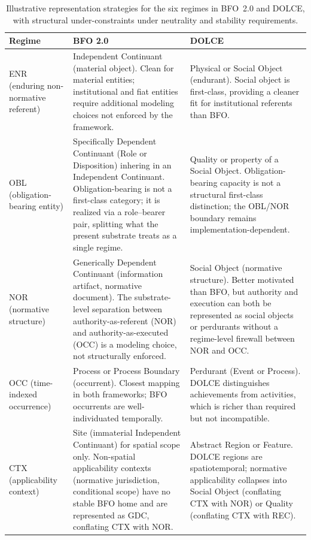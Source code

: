 \begin{table}[!htbp]
\centering
\caption{Illustrative representation strategies for the six regimes
in BFO~2.0 and DOLCE, with structural under-constraints
under neutrality and stability requirements.}
\label{tab:regime-mapping}
\small
\renewcommand{\arraystretch}{1.15}
\begin{tabular}{@{} p{1.5cm} p{5.2cm} p{4.7cm}@{}}
\toprule
\textbf{Regime} & \textbf{BFO 2.0} & \textbf{DOLCE} \\
\midrule

ENR (enduring non-normative referent) & Independent Continuant (material object).
Clean for material entities; institutional and fiat entities
require additional modeling choices not enforced by the framework. &
Physical or Social Object (endurant).
Social object is first-class, providing a cleaner fit for
institutional referents than BFO. \\

OBL (obligation-bearing entity) &
Specifically Dependent Continuant (Role or Disposition)
inhering in an Independent Continuant.
Obligation-bearing is not a first-class category;
it is realized via a role--bearer pair,
splitting what the present substrate treats as a single regime. &
Quality or property of a Social Object.
Obligation-bearing capacity is not a structural first-class
distinction; the OBL/NOR boundary remains implementation-dependent. \\

NOR (normative structure) &
Generically Dependent Continuant (information artifact,
normative document).
The substrate-level separation between authority-as-referent (NOR)
and authority-as-executed (OCC) is a modeling choice,
not structurally enforced. &
Social Object (normative structure).
Better motivated than BFO, but authority and execution
can both be represented as social objects or perdurants
without a regime-level firewall between NOR and OCC. \\

OCC (time-indexed occurrence) &
Process or Process Boundary (occurrent).
Closest mapping in both frameworks;
BFO occurrents are well-individuated temporally. &
Perdurant (Event or Process).
DOLCE distinguishes achievements from activities,
which is richer than required but not incompatible. \\

CTX (applicability context) &
Site (immaterial Independent Continuant) for spatial scope only.
Non-spatial applicability contexts (normative jurisdiction,
conditional scope) have no stable BFO home and are represented
as GDC, conflating CTX with NOR. &
Abstract Region or Feature.
DOLCE regions are spatiotemporal;
normative applicability collapses into Social Object
(conflating CTX with NOR) or Quality (conflating CTX with REC). \\


\end{tabular}
\end{table}
